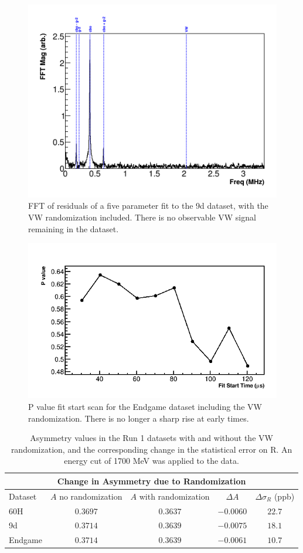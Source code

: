 \documentclass[12pt,letterpaper]{article}
\begin{document}
\begin{figure}[]
    \centering
    \includegraphics[width=.7\textwidth]{FFT_fiveParameter_9d_fVWRand}
    \caption[]{FFT of residuals of a five parameter fit to the 9d dataset, with the VW randomization included. There is no observable VW signal remaining in the dataset.}
    \label{fig:FFT_fiveParam_fVWRand}
\end{figure}

\begin{figure}[]
    \centering
    \includegraphics[width=.7\textwidth]{Pvalue_Endgame_withRand}
    \caption[]{P value fit start scan for the Endgame dataset including the VW randomization. There is no longer a sharp rise at early times.}
    \label{fig:Pval_Endgame_withVWRand}
\end{figure}



\begin{table}[]
\centering
\small
\setlength\tabcolsep{10pt}
\renewcommand{\arraystretch}{1.2}
\begin{tabular*}{1\linewidth}{@{\extracolsep{\fill}}lcccc}
  \hline
    \multicolumn{5}{c}{\textbf{Change in Asymmetry due to Randomization}} \\
  \hline\hline
    Dataset & $A$ no randomization & $A$ with randomization & $\Delta A$ & $\Delta \sigma_{R}$ (ppb) \\
  \hline
    60H & $0.3697$ & $0.3637$ & $-0.0060$ & $22.7$ \\
  \hline
    9d & $0.3714$ & $0.3639$ & $-0.0075$ & $18.1$ \\
  \hline
    Endgame & $0.3714$ & $0.3639$ & $-0.0061$ & $10.7$ \\
  \hline
\end{tabular*}
\caption[]{Asymmetry values in the Run 1 datasets with and without the VW randomization, and the corresponding change in the statistical error on R. An energy cut of 1700 MeV was applied to the data.}
\label{tab:A_change}
\end{table}
\end{document}
